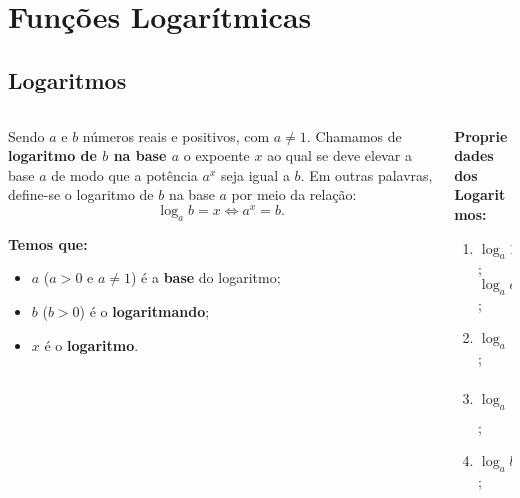 \section{Funções Logarítmicas}

\subsection{Logaritmos}
\begin{frame}
  \begin{columns}[onlytextwidth]
    \begin{column}{0.49\textwidth}\vspace{-0.55cm}
      \begin{definition}[Logaritmo]
        Sendo $a$ e $b$ números reais e positivos, com $a\not= 1$. Chamamos de \textbf{logaritmo de $b$ na base $a$} o expoente $x$ ao qual se deve elevar a base $a$ de modo que a potência $a^{x}$ seja igual a $b$. Em outras palavras, define-se o logaritmo de $b$ na base $a$ por meio da relação:
        \begin{equation*}
          \log_{a}{b} = x \Leftrightarrow a^{x} = b.
        \end{equation*}
      \end{definition}
      \begin{highlight}
        \textbf{Temos que:}
        \begin{itemize}
          \item $a$ ($a>0$ e $a\not=1$) é a \textbf{base} do logaritmo;
          \item $b$ ($b>0$) é o \textbf{logaritmando};
          \item $x$ é o \textbf{logaritmo}.
        \end{itemize}
      \end{highlight}
    \end{column}
    \begin{column}{0.49\textwidth}\vspace{-0.55cm}
      \begin{highlight}
        \textbf{Propriedades dos Logaritmos:}
        \begin{enumerate}
          \item $\log_{a}{1} = 0$; $\log_{a}{a} = 1$;
          \item $\log_{a}{\left(b\cdot c\right)} = \log_{a}{b} + \log_{a}{c}$;
          \item $\log_{a}{\left(\dfrac{b}{c}\right)} = \log_{a}{b} - \log_{a}{c}$;
          \item $\log_{a}{b^{m}} = m\cdot\log_{a}{b}$;

\end{enumerate}
\end{highlight}
\end{column}
\end{columns}
\end{frame}
